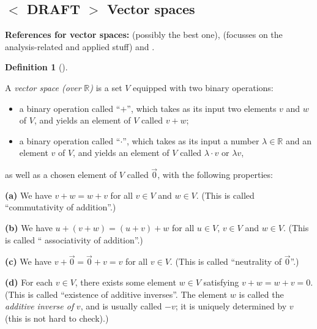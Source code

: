 \documentclass[numbers=enddot,12pt,final,onecolumn,notitlepage]{scrartcl}%
\theoremstyle{definition}
\newtheorem{defi}[theo]{Definition}
\newenvironment{definition}[1][]
{\begin{defi}[#1]\begin{leftbar}}
{\end{leftbar}\end{defi}}
\begin{document}
\subsection{%
$<$%
DRAFT%
$>$
Vector spaces}

\textbf{References for vector spaces:} \cite[\S 4.1-\S 4.2]{LaNaSc16}
(possibly the best one), \cite[\S 2.1]{OlvSha06} (focusses on the
analysis-related and applied stuff) and \cite[Two.I.1]{Heffer16}.

\begin{definition}
\label{def.vectspace}A \textit{vector space (over }$\mathbb{R}$\textit{)} is a
set $V$ equipped with two binary operations:

\begin{itemize}
\item a binary operation called \textquotedblleft$+$\textquotedblright, which
takes as its input two elements $v$ and $w$ of $V$, and yields an element of
$V$ called $v+w$;

\item a binary operation called \textquotedblleft$\cdot$\textquotedblright,
which takes as its input a number $\lambda\in\mathbb{R}$ and an element $v$ of
$V$, and yields an element of $V$ called $\lambda\cdot v$ or $\lambda v$,
\end{itemize}

as well as a chosen element of $V$ called $\overrightarrow{0}$, with the
following properties:

\textbf{(a)} We have $v+w=w+v$ for all $v\in V$ and $w\in V$. (This is called
\textquotedblleft commutativity of addition\textquotedblright.)

\textbf{(b)} We have $u+\left(  v+w\right)  =\left(  u+v\right)  +w$ for all
$u\in V$, $v\in V$ and $w\in V$. (This is called \textquotedblleft
associativity of addition\textquotedblright.)

\textbf{(c)} We have $v+\overrightarrow{0}=\overrightarrow{0}+v=v$ for all
$v\in V$. (This is called \textquotedblleft neutrality of $\overrightarrow{0}%
$\textquotedblright.)

\textbf{(d)} For each $v\in V$, there exists some element $w\in V$ satisfying
$v+w=w+v=0$. (This is called \textquotedblleft existence of additive
inverses\textquotedblright. The element $w$ is called the \textit{additive
inverse of }$v$, and is usually called $-v$; it is uniquely determined by $v$
(this is not hard to check).)


\end{definition}
\end{document}
